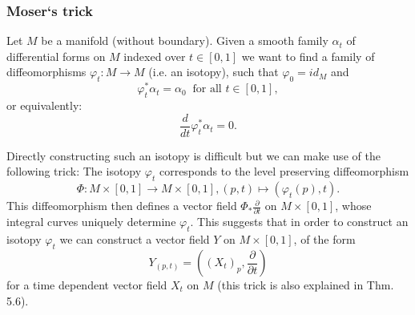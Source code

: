 \subsubsection{Moser`s trick}

Let $M$ be a manifold (without boundary). Given a smooth family $\alpha_t$ of differential forms on $M$ indexed over $t \in [0,1]$ we want to find a family of diffeomorphisms $\varphi_t \colon M \to M$ (i.e. an isotopy), such that $\varphi_0 = id_M$ and 
\[
    \varphi_t^\ast \alpha_t = \alpha_0 \: \text{ for all } t \in [0,1],
\]
or equivalently:
\begin{equation}
    \label{eq:mosers_trick}
    \frac{d}{dt} \varphi_t^\ast \alpha_t = 0.    
\end{equation}



Directly constructing such an isotopy is difficult but we can make use of the following trick: The isotopy $\varphi_t$ corresponds to the level preserving diffeomorphism
\[
\Phi \colon M \times [0,1] \to M \times [0,1], (p,t) \mapsto (\varphi_t(p),t).
\]
This diffeomorphism then defines a vector field $\Phi_\ast \frac{\partial}{\partial t}$ on $M \times [0,1]$, whose integral curves uniquely determine $\varphi_t$. This suggests that in order to construct an isotopy $\varphi_t$ we can construct a vector field $Y$ on $M \times [0,1]$, of the form 
\[
Y_{(p,t)} = ((X_t)_p, \frac{\partial}{\partial t}) 
\]
for a time dependent vector field $X_t$ on $M$ (this trick is also explained in \cite{Milnor1965hcobord} Thm. 5.6). 

